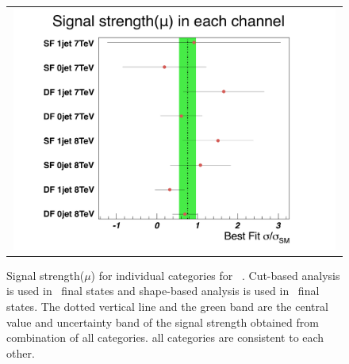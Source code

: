 %
\begin{figure}[htp] 
\centering 
\begin{tabular}{c} 
\includegraphics[width=0.99\textwidth]{figures/mu_allchannels.pdf}
\end{tabular} 
\caption{ Signal strength($\mu$) for individual categories for ~\GeV.
Cut-based analysis is used in \SF\ final states 
and shape-based analysis is used in \DF\ final states. 
The dotted vertical line and the green band are 
the central value and uncertainty band of the signal strength 
obtained from combination of all categories. 
all categories are consistent to each other.
} 
\label{fig:mu_allchannels} 
\end{figure} 

%
